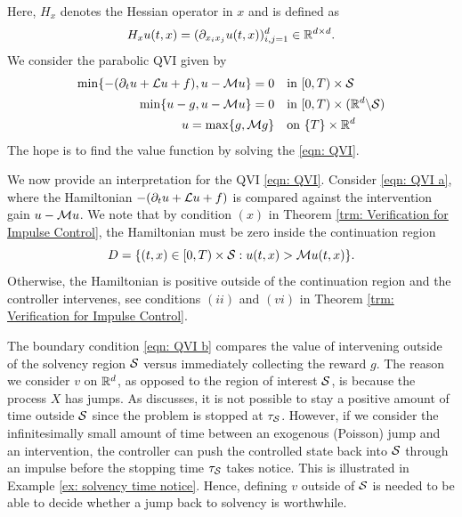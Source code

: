 Here, $H_x$ denotes the Hessian operator in $x$ and is defined as
\begin{equation*}
    H_x u(t,x) = (\partial_{x_i x_j}u(t,x))_{i,j=1}^d \in \mathbb{R}^{d \times d}.
\end{equation*}
We consider the parabolic QVI given by
\begin{subequations}
    \label{eqn: QVI}
    \begin{align}
    \min \{-(\partial_t u + \mathcal{L} u + f), u - \mathcal{M} u \} = 0 & \quad \text{in } [0,T) \times \mathcal{S} \label{eqn: QVI a} \\
    \min \{u-g, u - \mathcal{M} u \} = 0 & \quad \text{in } [0,T) \times (\mathbb{R}^d \backslash \mathcal{S} ) \label{eqn: QVI b} \\
    u = \max \{g, \mathcal{M} g \} & \quad \text{on } \{T\} \times \mathbb{R}^d \label{eqn: QVI c}
\end{align}
\end{subequations}
The hope is to find the value function by solving the \eqref{eqn: QVI}.

We now provide an interpretation for the QVI \eqref{eqn: QVI}. Consider \eqref{eqn: QVI a}, where the Hamiltonian $-(\partial_t u + \mathcal{L} u + f)$ is compared against the intervention gain $u-\mathcal{M} u$. We note that by condition $(x)$ in Theorem \ref{trm: Verification for Impulse Control}, the Hamiltonian must be zero inside the continuation region 
$$D=\{(t,x) \in [0,T)\times \mathcal{S}: u(t,x)>\mathcal{M} u(t,x)\}.$$
Otherwise, the Hamiltonian is positive outside of the continuation region and the controller intervenes, see conditions $(ii)$ and $(vi)$ in Theorem \ref{trm: Verification for Impulse Control}. 

The boundary condition \eqref{eqn: QVI b} compares the value of intervening outside of the solvency region $\mathcal{S}$ versus immediately collecting the reward $g$. The reason we consider $v$ on $\mathbb{R}^d$, as opposed to the region of interest $\mathcal{S}$, is because the process $X$ has jumps. As \textcite{seydel2010generalexistenceuniquenessviscosity} discusses, it is not possible to stay a positive amount of time outside $\mathcal{S}$ since the problem is stopped at $\tau_{\mathcal{S}}$. However, if we consider the infinitesimally small amount of time between an exogenous (Poisson) jump and an intervention, the controller can push the controlled state back into $\mathcal{S}$ through an impulse before the stopping time $\tau_{\mathcal{S}}$ takes notice. This is illustrated in Example \ref{ex: solvency time notice}. Hence, defining $v$ outside of $\mathcal{S}$ is needed to be able to decide whether a jump back to solvency is worthwhile. 

